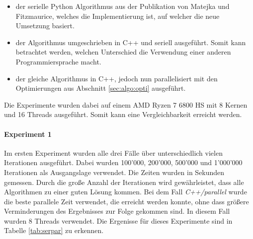 \documentclass[sigconf]{acmart}
\begin{document}
\begin{itemize}
  \item der serielle Python Algorithmus aus der Publikation von Matejka und Fitzmaurice, welches die Implementierung ist, auf welcher die neue Umsetzung basiert. 
  \item der Algorithmus umgeschrieben in C++ und seriell ausgeführt. Somit kann betrachtet werden, welchen Unterschied die Verwendung einer anderen Programmiersprache macht.
  \item der gleiche Algorithmus in C++, jedoch nun parallelisiert mit den Optimierungen aus Abschnitt \ref{sec:algo:opti} ausgeführt.
\end{itemize}

Die Experimente wurden dabei auf einem AMD Ryzen 7 6800 HS mit 8 Kernen und 16 Threads ausgeführt. Somit kann eine Vergleichbarkeit erreicht werden.

\paragraph{Experiment 1}

Im ersten Experiment wurden alle drei Fälle über unterschiedlich vielen Iterationen ausgeführt. Dabei wurden 100'000, 200'000, 500'000 und 1'000'000 Iterationen als Ausgangslage verwendet. Die Zeiten wurden in Sekunden gemessen. Durch die große Anzahl der Iterationen wird gewährleistet, dass alle Algorithmen zu einer guten Lösung kommen. 
Bei dem Fall \textit{C++/parallel} wurde die beste parallele Zeit verwendet, die erreicht werden konnte, ohne dass größere Verminderungen des Ergebnisses zur Folge gekommen sind. In diesem Fall wurden 8 Threads verwendet.
 Die Ergenisse für dieses Experimente sind in Tabelle \ref{tab:serpar} zu erkennen.
 
\begin{table}[htbp]
  \caption{Vergleich der Algorithmen und Ausführungsart über 100'000, 200'000, 500'000 und 1'000'000 Iterationen. Alle Angaben in Sekunden.}
  \label{tab:serpar}
\end{table}
\end{document}
